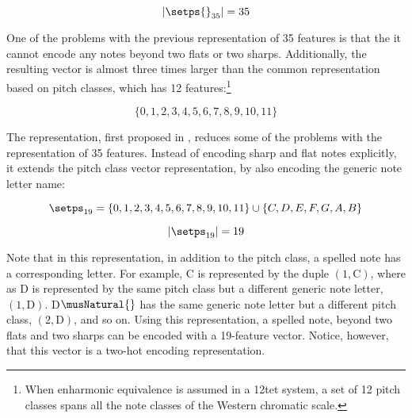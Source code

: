 \begin{equation}
    \label{eq:pitch_spelling_35_magnitude}
    | \setps{}_{35} | = 35
\end{equation}


One of the problems with the previous representation of 35
features is that the it cannot encode any notes beyond two
flats or two sharps. Additionally, the resulting vector is
almost three times larger than the common representation
based on pitch classes, which has 12 features:\footnote{When
enharmonic equivalence is assumed in a \gls{12tet} system, a
set of 12 pitch classes spans all the note classes of the
Western chromatic scale.}

\begin{equation}
    \{0, 1, 2, 3, 4, 5, 6, 7, 8, 9, 10, 11\}
\end{equation}

The representation, first proposed in
\textcite{napoleslopez2021augmentednet}, reduces some of the
problems with the representation of 35 features. Instead of
encoding \gls{sharp} and \gls{flat} notes explicitly, it
extends the pitch class vector representation, by also
encoding the generic note letter name:

\begin{equation}
    \label{eq:pitch_spelling_19}
    \setps_{19} = \{0, 1, 2, 3, 4, 5, 6, 7, 8, 9, 10, 11\} 
    \cup \{C, D, E, F, G, A, B\}
\end{equation}


\begin{equation}
    \label{eq:pitch_spelling_19_magnitude}
    | \setps_{19} | = 19
\end{equation}

Note that in this representation, in addition to the pitch
class, a spelled note has a corresponding letter. For
example, C\musSharp{} is represented by the duple $(1,
\text{C})$, where as D\musFlat{} is represented by the same
pitch class but a different generic note letter, $(1,
\text{D})$. D$\musNatural{}$ has the same generic note
letter but a different pitch class, $(2, \text{D})$, and so
on. Using this representation, a spelled note, beyond two
flats and two sharps can be encoded with a 19-feature
vector. Notice, however, that this vector is a two-hot
encoding representation.

